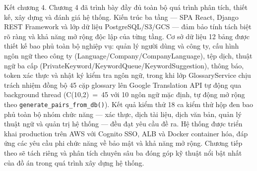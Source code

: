 Kết chương 4. Chương 4 đã trình bày đầy đủ toàn bộ quá trình phân tích, thiết kế, xây dựng và đánh giá hệ thống. Kiến trúc ba tầng --- SPA React, Django REST Framework và lớp dữ liệu PostgreSQL/S3/GCS --- đảm bảo tính tách biệt rõ ràng và khả năng mở rộng độc lập của từng tầng. Cơ sở dữ liệu 12 bảng được thiết kế bao phủ toàn bộ nghiệp vụ: quản lý người dùng và công ty, cấu hình ngôn ngữ theo công ty (Language/Company/CompanyLanguage), tệp dịch, thuật ngữ ba cấp (PrivateKeyword/KeywordQueue/KeywordSuggestion), thông báo, token xác thực và nhật ký kiểm tra ngôn ngữ, trong khi lớp GlossaryService chịu trách nhiệm đồng bộ 45 cặp glossary lên Google Translation API tự động qua background thread (C(10,2)~=~45 với 10 ngôn ngữ mặc định, tự động mở rộng theo \texttt{generate\_pairs\_from\_db()}). Kết quả kiểm thử 18 ca kiểm thử hộp đen bao phủ toàn bộ nhóm chức năng --- xác thực, dịch tài liệu, dịch văn bản, quản lý thuật ngữ và quản trị hệ thống --- đều đạt yêu cầu đề ra. Hệ thống được triển khai production trên AWS với Cognito SSO, ALB và Docker container hóa, đáp ứng các yêu cầu phi chức năng về bảo mật và khả năng mở rộng. Chương tiếp theo sẽ tách riêng và phân tích chuyên sâu ba đóng góp kỹ thuật nổi bật nhất của đồ án trong quá trình xây dựng hệ thống.
